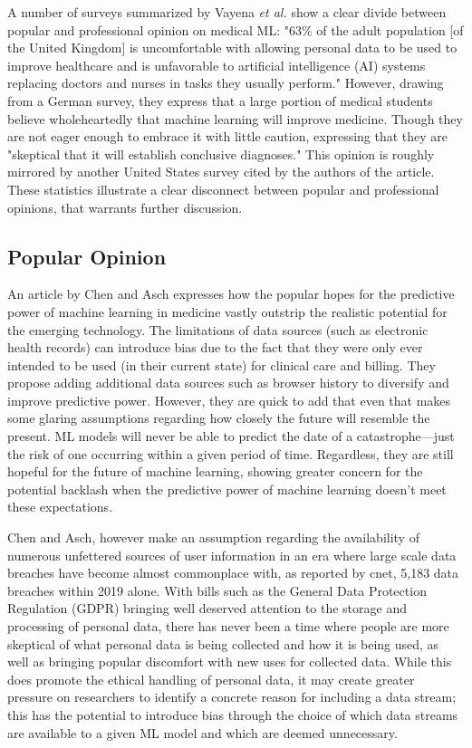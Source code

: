 \documentclass[]{article}
\begin{document}
		A number of surveys summarized by Vayena \emph{et al.} show a clear divide between popular and professional opinion on medical ML: "63\% of the adult population [of the United Kingdom] is uncomfortable with allowing personal data to be used to improve healthcare and is unfavorable to artificial intelligence (AI) systems replacing doctors and nurses in tasks they usually perform." However, drawing from a German survey, they express that a large portion of medical students believe wholeheartedly that machine learning will improve medicine. Though they are not eager enough to embrace it with little caution, expressing that they are "skeptical that it will establish conclusive diagnoses."\cite{Vayena2018} This opinion is roughly mirrored by another United States survey cited by the authors of the article.\cite{PintodosSantos2019} These statistics illustrate a clear disconnect between popular and professional opinions, that warrants further discussion.

		\subsection{Popular Opinion}

			An article by Chen and Asch expresses how the popular hopes for the predictive power of machine learning in medicine vastly outstrip the realistic potential for the emerging technology. The limitations of data sources (such as electronic health records) can introduce bias\cite{Gianfrancesco2018} due to the fact that they were only ever intended to be used (in their current state) for clinical care and billing. They propose adding additional data sources such as browser history to diversify and improve predictive power. However, they are quick to add that even that makes some glaring assumptions regarding how closely the future will resemble the present. ML models will never be able to predict the date of a catastrophe---just the risk of one occurring within a given period of time. Regardless, they are still hopeful for the future of machine learning, showing greater concern for the potential backlash when the predictive power of machine learning doesn't meet these expectations.\cite{Chen2017}

			Chen and Asch, however make an assumption regarding the availability of numerous unfettered sources of user information in an era where large scale data breaches have become almost commonplace with, as reported by cnet, 5,183 data breaches within 2019 alone.\cite{cnet2019databreaches} With bills such as the General Data Protection Regulation (GDPR) bringing well deserved attention to the storage and processing of personal data, there has never been a time where people are more skeptical of what personal data is being collected and how it is being used, as well as bringing popular discomfort with new uses for collected data.\cite{Vayena2018} While this does promote the ethical handling of personal data, it may create greater pressure on researchers to identify a concrete reason for including a data stream; this has the potential to introduce bias through the choice of which data streams are available to a given ML model and which are deemed unnecessary.\cite{Gianfrancesco2018}
			
\end{document}

